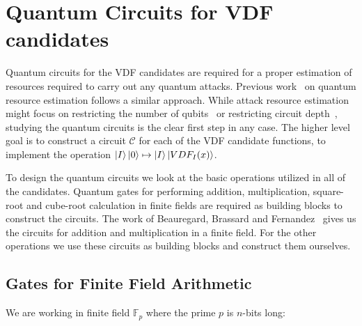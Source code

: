 \section{Quantum Circuits for VDF candidates}
 
Quantum circuits for the VDF candidates are required for a proper estimation of resources required to carry out any quantum attacks. Previous work~\cite{estimatesQuantumAES} on quantum resource estimation follows a similar approach. While attack resource estimation might focus on restricting the number of qubits~\cite{estimatesQuantumAES} or restricting circuit depth~\cite{keysearchQuantumAES}, studying the quantum circuits is the clear first step in any case. The higher level goal is to construct a circuit $\mathcal{C}$ for each of the VDF candidate functions, to implement the operation $\ket{I}\ket{0} \mapsto \ket{I}\ket{VDF_I(x)}$. 

To design the quantum circuits we look at the basic operations utilized in all of the candidates. Quantum gates for performing addition, multiplication, square-root and cube-root calculation in finite fields are required as building blocks to construct the circuits. The work of Beauregard, Brassard and Fernandez~\cite{quantumArithmetic} gives us the circuits for addition and multiplication in a finite field. For the other operations we use these circuits as building blocks and construct them ourselves.

\subsection{Gates for Finite Field Arithmetic}

We are working in finite field $\mathbb{F}_p$ where the prime $p$ is $n$-bits long:

